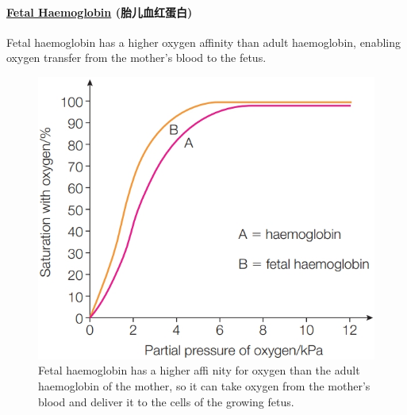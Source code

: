 \paragraph{\underline{Fetal Haemoglobin} (胎儿血红蛋白)}
Fetal haemoglobin has a higher oxygen affinity than adult haemoglobin, enabling oxygen transfer from the mother's blood to the
fetus.
\begin{figure}[H]
    \centering
    \includegraphics[scale=0.25]{Biology/1B/Images/1B-2-5.png}
    \caption{Fetal haemoglobin has a higher affi nity for oxygen than the adult haemoglobin of the mother, so it can take oxygen
    from the mother's blood and deliver it to the cells of the growing fetus.}
\end{figure}

